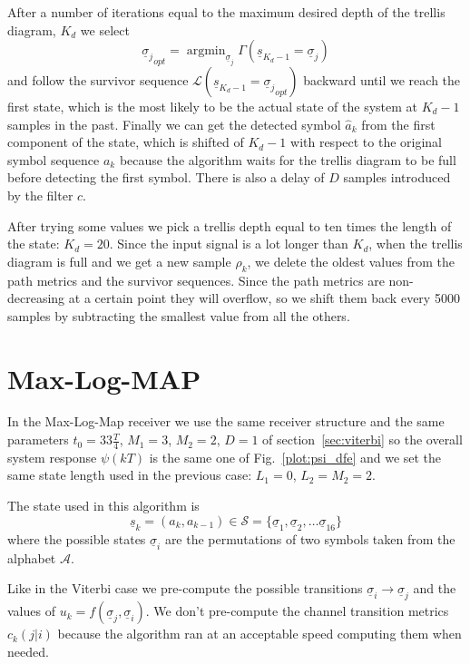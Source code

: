 \documentclass[a4paper,oneside]{article}
\renewcommand{\vec}[1]{\underline{#1}}
\DeclareMathOperator*{\argmin}{argmin}
\newcommand{\vsigma}[0]{\vec{\sigma}}
\begin{document}
After a number of iterations equal to the maximum desired depth of the
trellis diagram, $K_d$ we select
\begin{equation}
  {\vsigma_j}_{opt} = \argmin_{\vsigma_j} \Gamma(\vec{s}_{K_d-1} = \vec{\sigma}_j)
\end{equation}
and follow the survivor sequence $\mathcal{L}(\vec{s}_{K_d-1} =
{\vsigma_j}_{opt})$ backward until we reach the first state, which is
the most likely to be the actual state of the system at $K_d-1$
samples in the past. Finally we can get the detected symbol
$\hat{a}_{k}$ from the first component of the state, which is shifted
of $K_d-1$ with respect to the original symbol sequence $a_k$ because
the algorithm waits for the trellis diagram to be full before
detecting the first symbol. There is also a delay of $D$ samples
introduced by the filter $c$.

After trying some values we pick a trellis depth equal to ten times
the length of the state: $K_d = 20$. Since the input signal is a lot
longer than $K_d$, when the trellis diagram is full and we get a new
sample $\rho_k$, we delete the oldest values from the path metrics and
the survivor sequences. Since the path metrics are non-decreasing at a
certain point they will overflow, so we shift them back every 5000
samples by subtracting the smallest value from all the others.

\section{Max-Log-MAP}
In the Max-Log-Map receiver we use the same receiver structure and the
same parameters $t_0 = 33\frac{T}{4}$, $M_1 = 3$, $M_2 = 2$, $D=1$ of
section~\ref{sec:viterbi} so the overall system response $\psi(kT)$ is
the same one of Fig.~\ref{plot:psi_dfe} and we set the same state
length used in the previous case: $L_1 = 0$, $L_2 = M_2 = 2$.

The state used in this algorithm is
\begin{equation}
  \vec{s}_k = (a_k,a_{k-1}) \in \mathcal{S} = \{ \vec{\sigma}_1, \vec{\sigma}_2, \dots \vec{\sigma}_{16} \}
\end{equation}
where the possible states $\vsigma_i$ are the permutations of two
symbols taken from the alphabet $\mathcal{A}$.

Like in the Viterbi case we pre-compute the possible transitions
$\vsigma_i \rightarrow \vsigma_j$ and the values of $u_k =
f(\vsigma_j, \vsigma_i)$. We don't pre-compute the channel transition
metrics $c_k(j | i)$ because the algorithm ran at an acceptable speed
computing them when needed.
\end{document}
